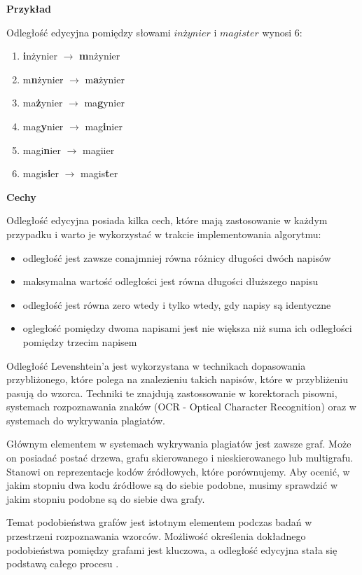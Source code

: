 \documentclass[a4paper,12pt]{article}
\begin{document}
\textbf{Przykład}

Odległość edycyjna pomiędzy słowami $inżynier$ i $magister$ wynosi 6:
\begin{enumerate}
\item \textbf{i}nżynier $\rightarrow$ \textbf{m}nżynier
\item m\textbf{n}żynier $\rightarrow$ m\textbf{a}żynier
\item ma\textbf{ż}ynier $\rightarrow$ ma\textbf{g}ynier
\item mag\textbf{y}nier $\rightarrow$ mag\textbf{i}nier
\item magi\textbf{n}ier $\rightarrow$ magiier
\item magis\textbf{i}er $\rightarrow$ magis\textbf{t}er
\end{enumerate}

\pagebreak

\textbf{Cechy}

Odległość edycyjna posiada kilka cech, które mają zastosowanie w każdym przypadku i warto je wykorzystać w trakcie implementowania algorytmu:
\begin{itemize}
\item odległość jest zawsze conajmniej równa różnicy długości dwóch napisów
\item maksymalna wartość odległości jest równa długości dłuższego napisu
\item odległość jest równa zero wtedy i tylko wtedy, gdy napisy są identyczne
\item ogległość pomiędzy dwoma napisami jest nie większa niż suma ich odległości pomiędzy trzecim napisem
\end{itemize}

Odległość Levenshtein'a jest wykorzystana w technikach dopasowania przybliżonego, które polega na znalezieniu takich napisów, które w przybliżeniu pasują do wzorca. Techniki te znajdują zastossowanie w korektorach pisowni, systemach rozpoznawania znaków  (OCR - Optical Character Recognition) oraz w systemach do wykrywania plagiatów.

Głównym elementem w systemach wykrywania plagiatów jest zawsze graf. Może on posiadać postać drzewa, grafu skierowanego i nieskierowanego lub multigrafu. Stanowi on reprezentacje kodów źródłowych, które porównujemy. Aby ocenić, w jakim stopniu dwa kodu źródłowe są do siebie podobne, musimy sprawdzić w jakim stopniu podobne są do siebie dwa grafy.

Temat podobieństwa grafów jest istotnym elementem podczas badań w przestrzeni rozpoznawania wzorców. Możliwość określenia dokładnego podobieństwa pomiędzy grafami jest kluczowa, a odległość edycyjna stała się podstawą całego procesu \cite{ged}.
\end{document}

